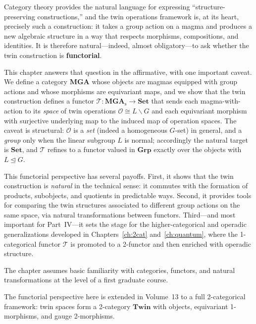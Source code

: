 \documentclass[11pt,a4paper,openany]{book}
\theoremstyle{plain}
\theoremstyle{definition}
\newcommand{\opspace}{\mathcal{O}}
\newcommand{\lingroup}{L}
\newcommand{\groupG}{G}
\begin{document}
Category theory provides the natural language for expressing ``structure-preserving constructions,'' and the twin operations framework is, at its heart, precisely such a construction: it takes a group action on a magma and produces a new algebraic structure in a way that respects morphisms, compositions, and identities. It is therefore natural---indeed, almost obligatory---to ask whether the twin construction is \textbf{functorial}.

This chapter answers that question in the affirmative, with one important caveat. We define a category $\mathbf{MGA}$ whose objects are magmas equipped with group actions and whose morphisms are equivariant maps, and we show that the twin construction defines a functor $\mathcal{T}: \mathbf{MGA}_{\mathrm{s}} \to \mathbf{Set}$ that sends each magma-with-action to its \emph{space} of twin operations $\opspace \cong \lingroup\backslash\groupG$ and each equivariant morphism with surjective underlying map to the induced map of operation spaces. The caveat is structural: $\opspace$ is a \emph{set} (indeed a homogeneous $\groupG$-set) in general, and a \emph{group} only when the linear subgroup $\lingroup$ is normal; accordingly the natural target is $\mathbf{Set}$, and $\mathcal{T}$ refines to a functor valued in $\mathbf{Grp}$ exactly over the objects with $\lingroup\trianglelefteq\groupG$.

This functorial perspective has several payoffs. First, it shows that the twin construction is \emph{natural} in the technical sense: it commutes with the formation of products, subobjects, and quotients in predictable ways. Second, it provides tools for comparing the twin structures associated to different group actions on the same space, via natural transformations between functors. Third---and most important for Part~IV---it sets the stage for the higher-categorical and operadic generalizations developed in Chapters~\ref{ch:2cat} and~\ref{ch:quantum}, where the 1-categorical functor $\mathcal{T}$ is promoted to a 2-functor and then enriched with operadic structure.

The chapter assumes basic familiarity with categories, functors, and natural transformations at the level of a first graduate course.

\begin{connectionbox}
The functorial perspective here is extended in Volume~13 to a full 2-categorical framework: twin spaces form a 2-category $\mathbf{Twin}$ with objects, equivariant 1-morphisms, and gauge 2-morphisms.
\end{connectionbox}
\end{document}
